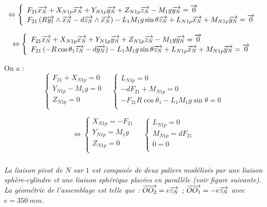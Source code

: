 \documentclass[10pt,fleqn]{article} %
\begin{document}
\begin{multicols}{2}
\begin{corrige}
$$ \Leftrightarrow
\left\{
\begin{array}{l}
F_{21}\overrightarrow{x_N}+X_{N1p}\overrightarrow{x_N}+Y_{N1p}\overrightarrow{y_N}+Z_{N1p}\overrightarrow{z_N} - M_1g\overrightarrow{y_N} = \overrightarrow{0}\\
 F_{21}\left( R\overrightarrow{y_1} \wedge \overrightarrow{x_N}- d\overrightarrow{z_N}\wedge \overrightarrow{x_N}\right)  
-L_1M_1g \sin \theta \overrightarrow{z_N} +L_{N1p}\overrightarrow{x_N}+M_{N1p}\overrightarrow{y_N} = \overrightarrow{0} \\
\end{array}
\right.
$$

$$ \Leftrightarrow
\left\{
\begin{array}{l}
F_{21}\overrightarrow{x_N}+X_{N1p}\overrightarrow{x_N}+Y_{N1p}\overrightarrow{y_N}+Z_{N1p}\overrightarrow{z_N} - M_1g\overrightarrow{y_N} = \overrightarrow{0}\\
 F_{21}\left( - R\cos\theta_1\overrightarrow{z_N}- d\overrightarrow{y_N}\right)  
-L_1M_1g \sin \theta \overrightarrow{z_N} +L_{N1p}\overrightarrow{x_N}+M_{N1p}\overrightarrow{y_N} = \overrightarrow{0} \\
\end{array}
\right.
$$

On a : 
$$
\left\{
\begin{array}{l}
F_{21}+X_{N1p} = 0 \\
Y_{N1p}- M_1g = 0 \\
Z_{N1p}=0 \\
\end{array}
\right.
\quad
\left\{
\begin{array}{l}
 L_{N1p} = {0} \\
- dF_{21}+M_{N1p} = {0} \\
-F_{21}  R\cos\theta_1-L_1M_1g \sin \theta  = {0} \\
\end{array}
\right.
$$

$$
\Leftrightarrow
\left\{
\begin{array}{l}
X_{N1p} = - F_{21}\\
Y_{N1p}= M_1g  \\
Z_{N1p}=0 \\
\end{array}
\right.
\quad
\left\{
\begin{array}{l}
 L_{N1p} = {0} \\
M_{N1p} =dF_{21} \\
0 = 0\\
\end{array}
\right.
$$



\end{corrige}
\else
\fi


\subparagraph{}\textit{
La liaison pivot de $N$ sur $1$ est composée de deux paliers modélisés par une liaison sphère-cylindre et une liaison sphérique placées en parallèle (voir figure suivante). La
géométrie de l’assemblage est telle que :
$\overrightarrow{OO_2}= e\overrightarrow{z_N}$ ; $\overrightarrow{OO_1}= -e\overrightarrow{z_N}$ avec $e=\SI{350}{mm}$.}
\ifprof
\begin{corrige}
\end{corrige}
\else
\fi





\end{multicols}
\end{document}
